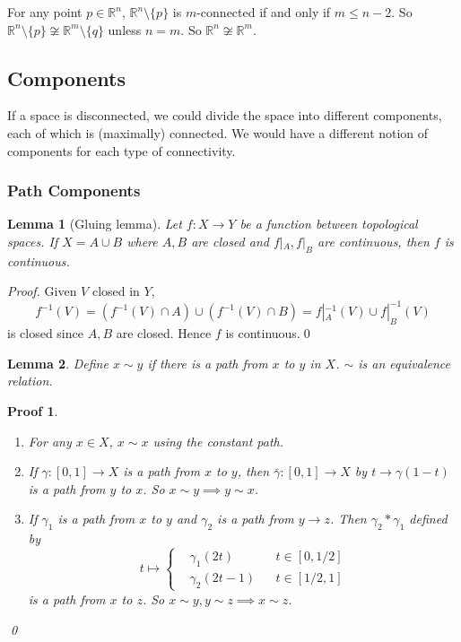 \documentclass{article}
\theoremstyle{plain}\theoremheaderfont{\normalfont\itshape}\theorembodyfont{\rmfamily}\theoremseparator{.}\newtheorem*{rem}{Remark}\newtheorem*{ex}{Example}\newtheorem*{proof}{Proof}\newtheorem*{altp}{Alternative proof}
\theoremstyle{plain}\theoremheaderfont{\normalfont\bfseries}\theorembodyfont{\rmfamily}\theoremseparator{.}\newtheorem{thm}{Theorem}[section]\newtheorem{lem}[thm]{Lemma}\newtheorem{prop}[thm]{Proposition}\newtheorem*{cor}{Corollary}\newtheorem{defn}[thm]{Definition}\newtheorem{clm}[thm]{Claim}\newtheorem{clminproof}{Claim}
\theoremstyle{break}\theoremheaderfont{\normalfont\itshape}\theorembodyfont{\rmfamily}\theoremseparator{.\medskip}\newtheorem*{proofskip}{Proof}\newtheorem*{exs}{Examples}\newtheorem*{rems}{Remarks}
\theoremstyle{break}\theoremheaderfont{\normalfont\bfseries}\theorembodyfont{\rmfamily}\theoremseparator{.\medskip}\newtheorem{lemskip}[thm]{Lemma}\newtheorem{defnskip}[thm]{Definition}\newtheorem{propskip}[thm]{Proposition}\newtheorem{thmskip}[thm]{Theorem}
\newcommand{\qed}{\hfill\ensuremath{\Box}}
\begin{document}
    For any point \(p\in\mathbb{R}^n\), \(\mathbb{R}^n\setminus\{p\}\) is \(m\)-connected if and only if \(m\le n-2\). So \(\mathbb{R}^n\setminus\{p\}\not\cong\mathbb{R}^m\setminus\{q\}\) unless \(n=m\). So \(\mathbb{R}^n\not\cong\mathbb{R}^m\).
    \subsection{Components}
    If a space is disconnected, we could divide the space into different components, each of which is (maximally) connected. We would have a different notion of components for each type of connectivity.
    \subsubsection{Path Components}
    \begin{lem}[Gluing lemma]
        Let \(f:X\to Y\) be a function between topological spaces. If \(X=A\cup B\) where \(A,B\) are closed and \(f|_A,f|_B\) are continuous, then \(f\) is continuous.
    \end{lem}
    \begin{proof}
        Given \(V\) closed in \(Y\),
        \[f^{-1}(V)=(f^{-1}(V)\cap A)\cup(f^{-1}(V)\cap B)=f|_A^{-1}(V)\cup f|_B^{-1}(V)\]
        is closed since \(A,B\) are closed. Hence \(f\) is continuous.\qed
    \end{proof}

    \begin{lem}
        Define \(x\sim y\) if there is a path from \(x\) to \(y\) in \(X\). \(\sim\) is an equivalence relation.
    \end{lem}
    \begin{proofskip}
        \begin{enumerate}[label=(\roman*),topsep=0pt]
            \item For any \(x\in X\), \(x\sim x\) using the constant path.
            \item If \(\gamma:[0,1]\to X\) is a path from \(x\) to \(y\), then \(\bar{\gamma}:[0,1]\to X\) by \(t\to\gamma(1-t)\) is a path from \(y\) to \(x\). So \(x\sim y\implies y\sim x\).
            \item If \(\gamma_1\) is a path from \(x\) to \(y\) and \(\gamma_2\) is a path from \(y\to z\). Then \(\gamma_2*\gamma_1\) defined by
            \[t\mapsto\left\{\begin{aligned}
                &\gamma_1(2t) && t\in[0,1/2]\\
                &\gamma_2(2t-1) && t\in[1/2,1]
            \end{aligned}\right.\]
            is a path from \(x\) to \(z\). So \(x\sim y,y\sim z\implies x\sim z\).
        \end{enumerate}\qed
    \end{proofskip}
\end{document}
